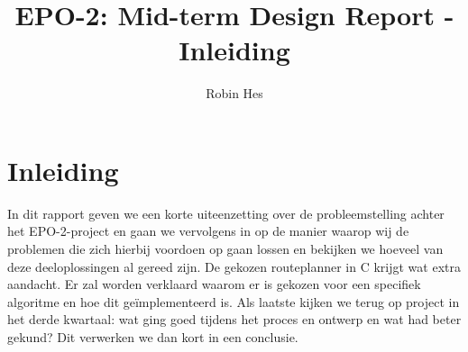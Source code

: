 \documentclass{report}
\title{EPO-2: Mid-term Design Report - Inleiding}
\author{Robin Hes}
\begin{document}
\chapter{Inleiding}
\label{ch:inleiding}

In dit rapport geven we een korte uiteenzetting over de probleemstelling achter het EPO-2-project en gaan we vervolgens in op de manier waarop wij de problemen die zich hierbij voordoen op gaan lossen en bekijken we hoeveel van deze deeloplossingen al gereed zijn. De gekozen routeplanner in C krijgt wat extra aandacht. Er zal worden verklaard waarom er is gekozen voor een specifiek algoritme en hoe dit geïmplementeerd is. Als laatste kijken we terug op project in het derde kwartaal: wat ging goed tijdens het proces en ontwerp en wat had beter gekund? Dit verwerken we dan kort in een conclusie. 
\end{document}
